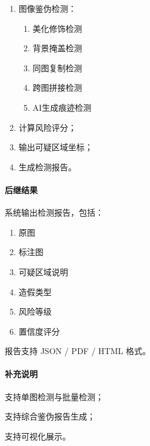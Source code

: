 {\begin{enumerate}
    \item 图像鉴伪检测：
    \begin{enumerate}
        \item 美化修饰检测
        \item 背景掩盖检测
        \item 同图复制检测
        \item 跨图拼接检测
        \item AI生成痕迹检测
    \end{enumerate}
    
    \item 计算风险评分；
    
    \item 输出可疑区域坐标；
    
    \item 生成检测报告。
\end{enumerate}

\paragraph*{后继结果}

系统输出检测报告，包括：

\begin{enumerate}
    \item 原图
    \item 标注图
    \item 可疑区域说明
    \item 造假类型
    \item 风险等级
    \item 置信度评分
\end{enumerate}

报告支持 JSON / PDF / HTML 格式。

\paragraph*{补充说明}

支持单图检测与批量检测；

支持综合鉴伪报告生成；

支持可视化展示。
}

